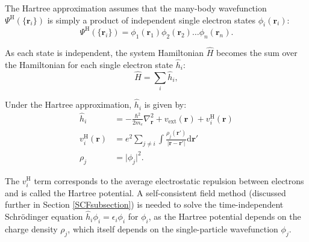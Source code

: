 The Hartree approximation assumes that the many-body wavefunction $\Psi^{\textrm{H}}(\{\textbf{r}_i\})$ is simply a product of independent single electron states $\phi_i(\textbf{r}_i)$:\autocite{Hartree1928}
\begin{equation}
\Psi^{\textrm{H}}(\{\textbf{r}_i\}) = \phi_1(\textbf{r}_1)\phi_2(\textbf{r}_2)\ldots\phi_n(\textbf{r}_n).
\end{equation}

As each state is independent, the system Hamiltonian $\hat{H}$ becomes the sum over the Hamiltonian for each single electron state $\hat{h}_i$:
\begin{equation}
\hat{H} = \sum_i\hat{h}_i,
\end{equation}

Under the Hartree approximation, $\hat{h}_i$ is given by:
\begin{align}
\hat{h}_i &= -\frac{\hbar^2}{2m_e}\nabla_{\textbf{r}}^2 + v_\mathrm{ext}(\textbf{r}) + v_i^\textrm{H}(\textbf{r}) \\
v_i^\textrm{H}(\textbf{r}) &= e^2\sum_{j\neq i} \int\frac{\rho_j(\textbf{r}')}{\lvert\textbf{r}-\textbf{r}'\rvert}\textrm{d}\textbf{r}' \\ \label{singleparticledensity}
\rho_j &= \lvert\phi_j\rvert^2.
\end{align}

The $v_i^\textrm{H}$ term corresponds to the average electrostatic repulsion between electrons and is called the Hartree potential. A self-consistent field method (discussed further in Section \ref{SCFsubsection}) is needed to solve the time-independent Schr\"{o}dinger equation $\hat{h}_i\phi_i=\epsilon_i\phi_i$ for $\phi_i$, as the Hartree potential depends on the charge density $\rho_j$, which itself depends on the single-particle wavefunction $\phi_j$. 


